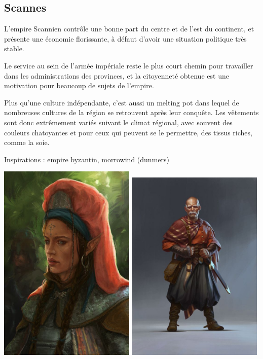 \documentclass[10pt,a4paper]{book}
\begin{document}
\subsection{Scannes}
L'empire Scannien contrôle une bonne part du centre et de l'est du continent, et présente une économie florissante, à défaut d'avoir une situation politique très stable.

Le service au sein de l'armée impériale reste le plus court chemin pour travailler dans les administrations des provinces, et la citoyenneté obtenue est une motivation pour beaucoup de sujets de l'empire.

Plus qu'une culture indépendante, c'est aussi un melting pot dans lequel de nombreuses cultures de la région se retrouvent après leur conquête. Les vêtements sont donc extrêmement variés suivant le climat régional, avec souvent des couleurs chatoyantes et pour ceux qui peuvent se le permettre, des tissus riches, comme la soie.

Inspirations : empire byzantin, morrowind (dunmers)

\includegraphics[width=0.49\textwidth]{elfe 3}
\includegraphics[width=0.49\textwidth]{humain 3}
\end{document}
